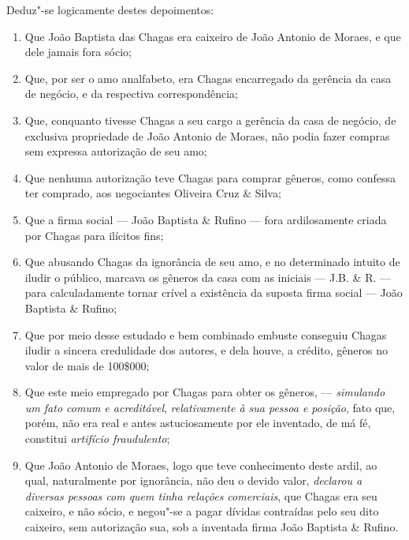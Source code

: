\asterisc

Deduz"-se logicamente destes depoimentos:

\begin{enumerate}[label=\arabic*º]
\item Que João Baptista das Chagas era caixeiro de João Antonio de Moraes,
e que dele jamais fora sócio;

\item Que, por ser o amo analfabeto, era Chagas encarregado da gerência da
casa de negócio, e da respectiva correspondência;

\item Que, conquanto tivesse Chagas a seu cargo a gerência da casa de
negócio, de exclusiva propriedade de João Antonio de Moraes, não podia
fazer compras sem expressa autorização de seu amo;

\item Que nenhuma autorização teve Chagas para comprar gêneros, como
confessa ter comprado, aos negociantes Oliveira Cruz \& Silva;

\item Que a firma social --- João Baptista \& Rufino --- fora ardilosamente
criada por Chagas para ilícitos fins;

\item Que abusando Chagas da ignorância de seu amo, e no determinado
intuito de iludir o público, marcava os gêneros da casa com as iniciais
--- J.B. \& R. --- para calculadamente tornar crível a existência da suposta
firma social --- João Baptista \& Rufino;

\item Que por meio desse estudado e bem combinado embuste conseguiu Chagas
iludir a sincera credulidade dos autores, e dela houve, a crédito,
gêneros no valor de mais de 100\$000;

\item Que este meio empregado por Chagas para obter os gêneros, ---
\emph{simulando um fato comum e acreditável}, \emph{relativamente à sua
pessoa e posição}, fato que, porém, não era real e antes astuciosamente
por ele inventado, de má fé, constitui \emph{artifício fraudulento};

\item Que João Antonio de Moraes, logo que teve conhecimento deste ardil,
ao qual, naturalmente por ignorância, não deu o devido valor,
\emph{declarou a diversas pessoas com quem tinha relações comerciais},
que Chagas era seu caixeiro, e não sócio, e negou"-se a pagar dívidas
contraídas pelo seu dito caixeiro, sem autorização sua, sob a inventada
firma João Baptista \& Rufino.
\end{enumerate}

